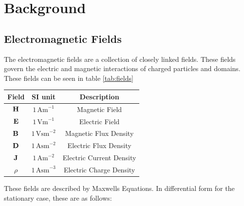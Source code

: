 \chapter{Background}

\section{Electromagnetic Fields}
The electromagnetic fields are a collection of closely linked fields.
These fields govern the electric and magnetic interactions of charged
particles and domains. These fields can be seen in table \ref{tab:fields}

\begin{center}
    \begin{tabular}{c c c}
        \label{tab:fields}
        Field    & SI unit         & Description              \\
        \hline
        $\vb{H}$ & $1\, \text{Am}^{-1} $  & Magnetic Field           \\
        $\vb{E}$ & $1\, \text{Vm}^{-1} $  & Electric Field           \\
        $\vb{B}$ & $1\, \text{Vsm}^{-2} $ & Magnetic Flux Density    \\
        $\vb{D}$ & $1\, \text{Asm}^{-2} $ & Electric Flux Density    \\
        $\vb{J}$ & $1\, \text{Am}^{-2} $  & Electric Current Density \\
        $\rho$   & $1\, \text{Asm}^{-3} $ & Electric Charge Density
    \end{tabular}
\end{center}
These fields are described by Maxwells Equations.
In differential form for the stationary case, these are as follows:

